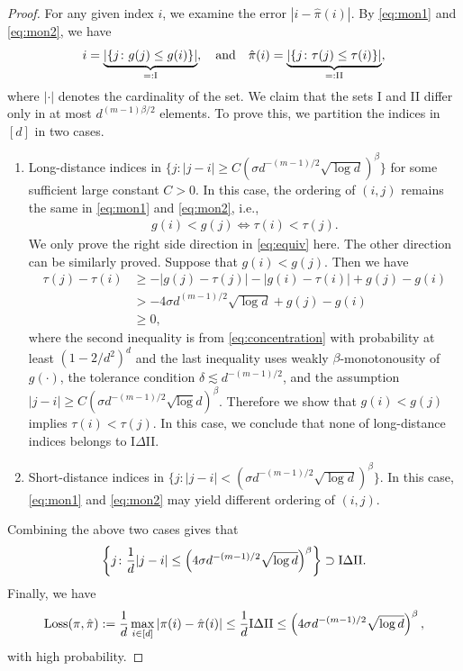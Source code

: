 \documentclass[11pt]{article}
\theoremstyle{definition}
\begin{document}
\begin{proof}
For any given index $i$, we examine the error $|i-\hat\pi(i)|$. By \eqref{eq:mon1} and \eqref{eq:mon2}, we have
\begin{align}
    i = \underbrace{|\{j\colon g(j)\leq g(i)\}|}_{=:\textup{I}},\quad\text{and}\quad \hat\pi(i) = \underbrace{|\{j\colon \tau(j)\leq \tau(i)\}|}_{=:\textup{II}},
\end{align}
where $|\cdot|$ denotes the cardinality of the set. We claim that the sets I and II differ only in at most $d^{(m-1)\beta/2}$ elements. To prove this, we partition the indices in $[d]$ in two cases.
\begin{enumerate}[wide, labelwidth=0pt, labelindent=0pt]
    \item Long-distance indices in $\{j\colon|j-i|\geq 
C \left(\sigma d^{-(m-1)/2}\sqrt{\log d}\right)^{\beta} \}$ for some sufficient large constant $C>0$. In this case, the ordering of $(i,j)$ remains the same in \eqref{eq:mon1} and \eqref{eq:mon2}, i.e.,
    \begin{align}\label{eq:equiv}
        g(i) < g(j) \Longleftrightarrow \tau(i) < \tau(j).
    \end{align}
    We only prove the right side direction in  \eqref{eq:equiv} here. The other direction can be similarly proved.
    Suppose that $g(i) < g(j)$. Then we have
    \begin{align}
        \tau(j)-\tau(i) &\geq -|g(j)-\tau(j)|-|g(i)-\tau(i)| + g(j)-g(i)
       \\& > -4\sigma d^{(m-1)/2}\sqrt{\log d} + g(j)-g(i)
       \\&\geq 0,
    \end{align}
    where the second inequality is from \eqref{eq:concentration} with probability at least $(1-2/d^2)^d$ and the last inequality uses weakly $\beta$-monotonousity of $g(\cdot)$, the tolerance condition $\delta\lesssim  d^{-(m-1)/2}$, and the assumption
    $|j-i|\geq C\left(\sigma d^{-(m-1)/2}\sqrt{\log} d\right)^{\beta}$. Therefore we show that $g(i)<g(j)$ implies $\tau(i)<\tau(j).$
    In this case, we conclude that none of long-distance indices belongs to I$\Delta$II.
    \item Short-distance indices in $\{j\colon|j-i|< \left(\sigma d^{-(m-1)/2}\sqrt{\log d}\right)^{\beta} \}$. In this case, \eqref{eq:mon1} and \eqref{eq:mon2} may yield different ordering of $(i,j).$
\end{enumerate}
Combining the above two cases gives that 
\begin{align}
   \left \{j\colon\frac{1}{d}|j-i|\leq \left(4\sigma d^{-(m-1)/2}\sqrt{\log d}\right)^{\beta}\right \}\supset \textup{I}\Delta\textup{II}.
\end{align}
Finally, we have
\begin{align}
    \textup{Loss}(\pi,\hat\pi) := \frac{1}{d}\max_{i\in[d]}|\pi(i)-\hat\pi(i)|\leq\frac{1}{d}\textup{I}\Delta\textup{II}\leq \left(4\sigma d^{-(m-1)/2}\sqrt{\log d}\right)^{\beta},
\end{align}
with high probability.
\end{proof}
\end{document}
